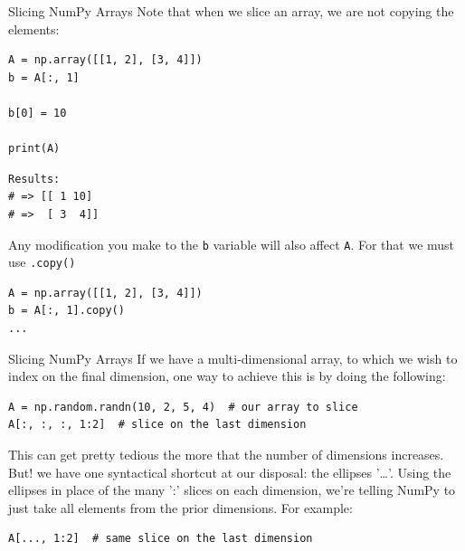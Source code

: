 \documentclass[10pt]{beamer}
\begin{document}
\begin{frame}[label={sec:orgb7297ad},fragile]{Slicing NumPy Arrays}
 Note that when we slice an array, we are \alert{not copying} the elements:

\begin{verbatim}
A = np.array([[1, 2], [3, 4]])
b = A[:, 1]

b[0] = 10

print(A)
\end{verbatim}

\begin{verbatim}
Results: 
# => [[ 1 10]
# =>  [ 3  4]]
\end{verbatim}


Any modification you make to the \texttt{b} variable will also affect \texttt{A}. For that we must use
\texttt{.copy()}

\begin{verbatim}
A = np.array([[1, 2], [3, 4]])
b = A[:, 1].copy()
...
\end{verbatim}
\end{frame}

\begin{frame}[label={sec:org246f2ea},fragile]{Slicing NumPy Arrays}
 If we have a multi-dimensional array, to which we wish to index on the final
dimension, one way to achieve this is by doing the following:

\begin{verbatim}
A = np.random.randn(10, 2, 5, 4)  # our array to slice
A[:, :, :, 1:2]  # slice on the last dimension
\end{verbatim}

This can get pretty tedious the more that the number of dimensions increases. But! we
have one syntactical shortcut at our disposal: the ellipses '\ldots{}'. Using the ellipses
in place of the many ':' slices on each dimension, we're telling NumPy to just take
all elements from the prior dimensions. For example:

\begin{verbatim}
A[..., 1:2]  # same slice on the last dimension
\end{verbatim}
\end{frame}
\end{document}
